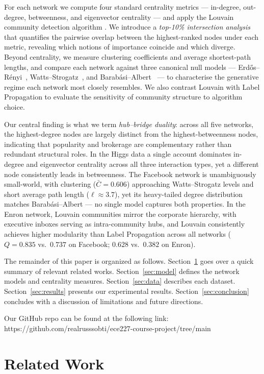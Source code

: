 For each network we compute four standard centrality metrics — in-degree,
out-degree, betweenness, and eigenvector centrality — and apply the Louvain
community detection algorithm \citep{blondel2008}.
We introduce a \textit{top-10\% intersection analysis} that quantifies the
pairwise overlap between the highest-ranked nodes under each metric,
revealing which notions of importance coincide and which diverge.
Beyond centrality, we measure clustering coefficients and average
shortest-path lengths, and compare each network against three canonical
null models — Erd\H{o}s--R\'enyi~\citep{erdos1959}, Watts--Strogatz~\citep{watts1998},
and Barab\'asi--Albert~\citep{barabasi1999} — to characterise the
generative regime each network most closely resembles.
We also contrast Louvain with Label Propagation to evaluate the
sensitivity of community structure to algorithm choice.

Our central finding is what we term \textit{hub--bridge duality}: across all
five networks, the highest-degree nodes are largely distinct from the
highest-betweenness nodes, indicating that popularity and brokerage are
complementary rather than redundant structural roles.
In the Higgs data a single account dominates in-degree and eigenvector
centrality across all three interaction types, yet a different node
consistently leads in betweenness.
The Facebook network is unambiguously small-world, with clustering
($\bar{C} = 0.606$) approaching Watts--Strogatz levels and short average
path length ($\ell \approx 3.7$), yet its heavy-tailed degree distribution
matches Barab\'asi--Albert — no single model captures both properties.
In the Enron network, Louvain communities mirror the corporate hierarchy,
with executive inboxes serving as intra-community hubs, and Louvain
consistently achieves higher modularity than Label Propagation across
all networks ($Q = 0.835$ vs.\ $0.737$ on Facebook; $0.628$ vs.\ $0.382$
on Enron).

The remainder of this paper is organized as follows.
Section~\ref{sec:related} goes over a quick summary of relevant related works.
Section~\ref{sec:model} defines the network models and centrality measures.
Section~\ref{sec:data} describes each dataset.
Section~\ref{sec:results} presents our experimental results.
Section~\ref{sec:conclusion} concludes with a discussion of limitations and
future directions.

Our GitHub repo can be found at the following link:
https://github.com/realrusssobti/ece227-course-project/tree/main

\section{Related Work}
\label{sec:related}

